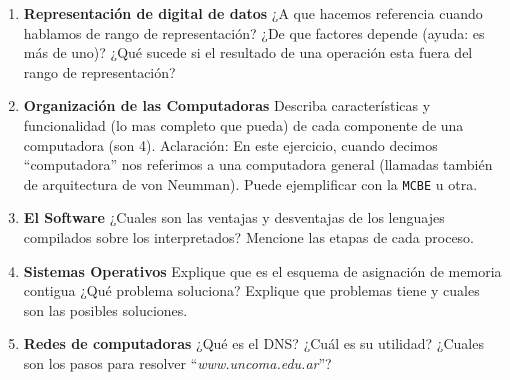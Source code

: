 \documentclass[12pt]{article}
\def\maketitle{

\makeatletter{
    \color{blue} \centering \huge \sc
    \textbf{
        Examen final regular
    }\\
    \par
}
\makeatother

\makeatletter


}
\begin{document}
\begin{minipage}[c]{\linewidth}
\thispagestyle{empty}
\maketitle
\setlength{\parindent}{1pt}

\begin{enumerate}[topsep=4pt,itemsep=2pt,partopsep=2pt, parsep=2pt]

    \item \textbf{Representación de digital de datos}
        ¿A que hacemos referencia cuando hablamos de rango de representación?
        ¿De que factores depende (ayuda: es más de uno)? ¿Qué sucede si el
        resultado de una operación esta fuera del rango de representación?

    \item \textbf{Organización de las Computadoras}
        Describa características y funcionalidad (lo mas completo que pueda)
        de cada componente de una computadora (son 4). Aclaración: En este
        ejercicio, cuando decimos ``computadora'' nos referimos a una
        computadora general (llamadas también de arquitectura de von Neumman).
        Puede ejemplificar con la \texttt{MCBE} u otra.

    \item \textbf{El Software}
        ¿Cuales son las ventajas y desventajas de los lenguajes compilados
        sobre los interpretados? Mencione las etapas de cada proceso.

    \item \textbf{Sistemas Operativos}
        Explique que es el esquema de asignación de memoria contigua ¿Qué
        problema soluciona? Explique que problemas tiene y cuales son las
        posibles soluciones.

    \item \textbf{Redes de computadoras}
        ¿Qué es el DNS? ¿Cuál es su utilidad? ¿Cuales son los pasos para
        resolver ``\emph{www.uncoma.edu.ar}''?


\end{enumerate}
\end{minipage}
\end{document}
